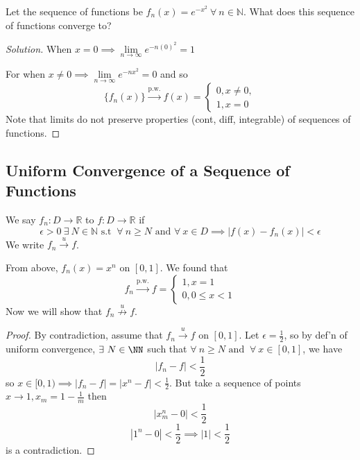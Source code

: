 \documentclass[12pt]{scrartcl}
\newcommand{\pw}{\overset{\text{p.w.}}{\longrightarrow}}
\begin{document}
\begin{example}
  Let the sequence of functions be $f_n(x) = e^{-x^2} \ \forall \ n \in \mathbb{N}$. What does this 
  sequence of functions converge to?

  \begin{proof}[Solution]
    When $x=0 \implies \underset{n\to\infty}{\lim}e^{-n(0)^2} = 1$

    For when $x \neq 0 \implies \underset{n\to\infty}{\lim}e^{-nx^2} = 0$ and so
    \[\{f_n(x)\} \overset{\text{p.w.}}{\longrightarrow} f(x) = \begin{cases} 0, x \neq 0, \\ 1, x = 0 \end{cases} \] 
    Note that limits do not preserve properties (cont, diff, integrable) of sequences of functions.
  \end{proof}
\end{example}

\subsection{Uniform Convergence of a Sequence of Functions}

\begin{definition}
  We say $f_n: D \to \mathbb{R}$  to $f: D \to \mathbb{R}$ 
  if
  \[\epsilon > 0 \ \exists \ N \in \mathbb{N} \text{ s.t } \ \forall \ n \geq N \text{ and } \forall \ x \in D \implies |f(x) - f_n(x)| < \epsilon\]
  We write $f_n \overset{u}{\longrightarrow} f$.

\end{definition}

\begin{example}
  From above, $f_n(x) = x^n$ on $[0, 1]$. We found that
  \[f_n \pw f = \begin{cases} 1, x = 1\\ 0, 0 \leq x < 1\end{cases}\]
  Now we will show that $f_n \overset{u}{\not\longrightarrow} f$. 

  \begin{proof}
    By contradiction, assume that $f_n \overset{u}{\longrightarrow} f$ on $[0, 1]$. Let 
    $\epsilon = \frac{1}{2}$, so by def'n of uniform convergence, $\exists \ N \in \NN$ such that 
    $\forall \ n \geq N \text{ and } \ \forall \ x \in [0, 1]$, we have 
    \[|f_n - f| < \frac{1}{2}\]
    so $x \in [0, 1) \implies |f_n - f| = |x^n - f| < \frac{1}{2}$. But take a sequence of points 
    $x \to 1, x_m = 1 - \frac{1}{m}$ then 
    \[|x_m^n - 0| < \frac{1}{2}\]
    \[|1^n - 0| < \frac{1}{2} \implies |1| < \frac{1}{2}\]
    is a contradiction. 
  \end{proof}
\end{example}
\end{document}
